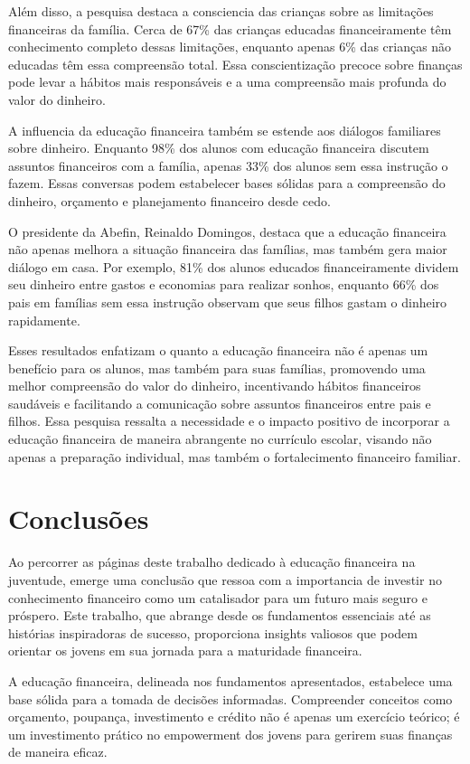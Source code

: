 \documentclass{report}
\begin{document}
Além disso, a pesquisa destaca a consciencia das crianças sobre as limitações financeiras da família. Cerca de 67\% das crianças educadas financeiramente têm conhecimento completo dessas limitações, enquanto apenas 6\% das crianças não educadas têm essa compreensão total. Essa conscientização precoce sobre finanças pode levar a hábitos mais responsáveis e a uma compreensão mais profunda do valor do dinheiro.

A influencia da educação financeira também se estende aos diálogos familiares sobre dinheiro. Enquanto 98\% dos alunos com educação financeira discutem assuntos financeiros com a família, apenas 33\% dos alunos sem essa instrução o fazem. Essas conversas podem estabelecer bases sólidas para a compreensão do dinheiro, orçamento e planejamento financeiro desde cedo.

O presidente da Abefin, Reinaldo Domingos, destaca que a educação financeira não apenas melhora a situação financeira das famílias, mas também gera maior diálogo em casa. Por exemplo, 81\% dos alunos educados financeiramente dividem seu dinheiro entre gastos e economias para realizar sonhos, enquanto 66\% dos pais em famílias sem essa instrução observam que seus filhos gastam o dinheiro rapidamente.

Esses resultados enfatizam o quanto a educação financeira não é apenas um benefício para os alunos, mas também para suas famílias, promovendo uma melhor compreensão do valor do dinheiro, incentivando hábitos financeiros saudáveis e facilitando a comunicação sobre assuntos financeiros entre pais e filhos. Essa pesquisa ressalta a necessidade e o impacto positivo de incorporar a educação financeira de maneira abrangente no currículo escolar, visando não apenas a preparação individual, mas também o fortalecimento financeiro familiar.

\chapter{Conclusões}
\label{chap.conclusao}
Ao percorrer as páginas deste trabalho dedicado à educação financeira na juventude, emerge uma conclusão que ressoa com a importancia de investir no conhecimento financeiro como um catalisador para um futuro mais seguro e próspero. Este trabalho, que abrange desde os fundamentos essenciais até as histórias inspiradoras de sucesso, proporciona insights valiosos que podem orientar os jovens em sua jornada para a maturidade financeira.

A educação financeira, delineada nos fundamentos apresentados, estabelece uma base sólida para a tomada de decisões informadas. Compreender conceitos como orçamento, poupança, investimento e crédito não é apenas um exercício teórico; é um investimento prático no empowerment dos jovens para gerirem suas finanças de maneira eficaz.
\end{document}
